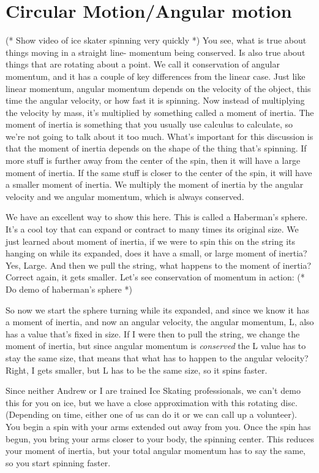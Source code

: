 \documentclass[12pt]{article}
\begin{document}
\section{Circular Motion/Angular motion}
(* Show video of ice skater spinning very quickly *)
You see, what is true about things moving in a straight line- momentum being conserved. Is also 
true about things that are rotating about a point. We call it conservation of angular momentum,
and it has a couple of key differences from the linear case. Just like linear momentum, 
angular momentum depends on the velocity of the object, this time the angular velocity,
or how fast it is spinning. Now instead of multiplying the velocity by mass, it's
multiplied by something called a moment of inertia. The moment of inertia is something
that you usually use calculus to calculate, so we're not going to talk about it too much.
What's important for this discussion is that the moment of inertia depends on the shape
of the thing that's spinning. If more stuff is further away from the center of the spin, 
then it will have a large moment of inertia. If the same stuff is closer to the center
of the spin, it will have a smaller moment of inertia. We multiply the moment of inertia
by the angular velocity and we angular momentum, which is always conserved. 

We have an excellent way to show
this here. This is called a Haberman's sphere. It's a cool toy that can expand or contract
to many times its original size. We just learned about moment of inertia, if we were to spin 
this on the string its hanging on while its expanded, does it have a small, or large moment
of inertia? Yes, Large. And then we pull the string, what happens to the moment of inertia? 
Correct again, it gets smaller. Let's see conservation of momentum in action: 
(* Do demo of haberman's sphere *)

So now we start the sphere turning while its expanded, and since we know it has a moment of 
inertia, and now an angular velocity, the angular momentum, L, also has a value that's 
fixed in size. If I were then to pull the string, we change the moment of inertia, but since 
angular momentum is \emph{conserved} the L value has to stay the same size, that means that
what has to happen to the angular velocity? Right, I gets smaller, but L has to be the same
size, so it spins faster.

Since neither Andrew or I are trained Ice Skating professionals, we can't demo this for you 
on ice, but we have a close approximation with this rotating disc. (Depending on time, 
either one of us can do it or we can call up a volunteer). You begin a spin with your arms
extended out away from you. Once the spin has begun, you bring your arms closer 
to your body, the spinning center. This reduces your moment of inertia, but your total
angular momentum has to say the same, so you start spinning faster.
\end{document}
